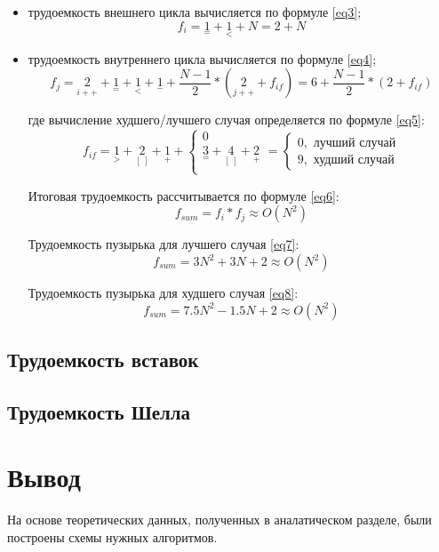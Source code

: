 \begin{itemize}
	\item трудоемкость внешнего цикла вычисляется по формуле \ref{eq3};
	\begin{equation}
		\label{eq3} 
		f_{i} = {\underset{=}{1}} + {\underset{<}{1}} + N= 2 + N
	\end{equation}

	\item трудоемкость внутреннего цикла вычисляется по формуле \ref{eq4};
	\begin{equation}
		\label{eq4} 
		f_{j} = {\underset{i++}{2}} + {\underset{=}{1}} + {\underset{<}{1}} + {\underset{-}{1}} +
				\frac{N-1}{2}*({\underset{j++}{2}} + f_{if}) = 6 + \frac{N-1}{2}*(2 + f_{if})
	\end{equation}

	где вычисление худшего/лучшего случая определяется по формуле \ref{eq5}:
	 \begin{equation}
	 	\label{eq5}
	 	f_{if} = {\underset{>}{1}} + {\underset{[\ ]}{2}} + {\underset{+}{1}} +
	 	\begin{cases}
	 		0\\
	 		{\underset{=}{3}} + {\underset{[\ ]}{4}} +{\underset{+}{2}}\\
	 	\end{cases}
 		=
 		\begin{cases}
 			0, \text{  лучший случай}\\
 			9, \text{  худший случай}
 		\end{cases}
	 \end{equation}
 
 	Итоговая трудоемкость рассчитывается по формуле \ref{eq6}:
 	\begin{equation}
 		\label{eq6}
 		f_{sum} = f_{i} * f_{j} \approx O(N^2)
 	\end{equation}
 	
 	Трудоемкость пузырька для лучшего случая \ref{eq7}:
 	\begin{equation}
 		\label{eq7}
 		f_{sum} = 3N^2 + 3N + 2 \approx O(N^2)
 	\end{equation}
 
	 Трудоемкость пузырька для худшего случая \ref{eq8}:
	 \begin{equation}
	 	\label{eq8}
	 	f_{sum} = 7.5N^2 - 1.5N + 2 \approx O(N^2)
	 \end{equation}

\end{itemize}
\subsection{Трудоемкость вставок}
\subsection{Трудоемкость Шелла}


\section*{Вывод}
На основе теоретических данных, полученных в аналатическом разделе, были построены схемы нужных алгоритмов.